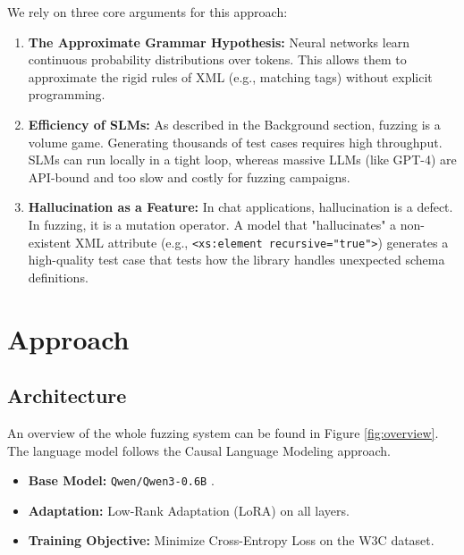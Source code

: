 \documentclass[11pt]{article}
\begin{document}
We rely on three core arguments for this approach:
\begin{enumerate}
    \item \textbf{The Approximate Grammar Hypothesis:} Neural networks learn continuous probability distributions over tokens. This allows them to approximate the rigid rules of XML (e.g., matching tags) without explicit programming.
    \item \textbf{Efficiency of SLMs:} As described in the Background section, fuzzing is a volume game. Generating thousands of test cases requires high throughput. SLMs can run locally in a tight loop, whereas massive LLMs (like GPT-4) are API-bound and too slow and costly for fuzzing campaigns.
    \item \textbf{Hallucination as a Feature:} In chat applications, hallucination is a defect. In fuzzing, it is a mutation operator. A model that "hallucinates" a non-existent XML attribute (e.g., \texttt{<xs:element recursive="true">}) generates a high-quality test case that tests how the library handles unexpected schema definitions.
\end{enumerate}

\section{Approach} \label{proposed}

\subsection{Architecture}

An overview of the whole fuzzing system can be found in Figure \ref{fig:overview}. The language model follows the Causal Language Modeling approach.
\begin{itemize}
    \item \textbf{Base Model:} \texttt{Qwen/Qwen3-0.6B} \cite{qwen3}.
    \item \textbf{Adaptation:} Low-Rank Adaptation (LoRA) \cite{hu2021loralowrankadaptationlarge} on all layers.
    \item \textbf{Training Objective:} Minimize Cross-Entropy Loss on the W3C dataset.
\end{itemize}
\end{document}
